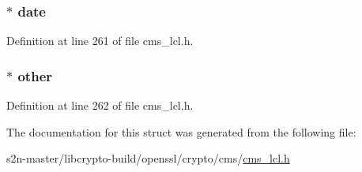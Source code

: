 \subsubsection[{\texorpdfstring{date}{date}}]{$\ast$ date}\hypertarget{struct_c_m_s___k_e_k_identifier__st_a8dac4347fb9055f16f81837db490d51a}{}\label{struct_c_m_s___k_e_k_identifier__st_a8dac4347fb9055f16f81837db490d51a}


Definition at line 261 of file cms\+\_\+lcl.\+h.

\subsubsection[{\texorpdfstring{other}{other}}]{$\ast$ other}\hypertarget{struct_c_m_s___k_e_k_identifier__st_a75d0a1d8882aba95c23c4e0e11debc48}{}\label{struct_c_m_s___k_e_k_identifier__st_a75d0a1d8882aba95c23c4e0e11debc48}


Definition at line 262 of file cms\+\_\+lcl.\+h.



The documentation for this struct was generated from the following file\+:\begin{DoxyCompactItemize}
\item 
s2n-\/master/libcrypto-\/build/openssl/crypto/cms/\hyperlink{cms__lcl_8h}{cms\+\_\+lcl.\+h}\end{DoxyCompactItemize}
